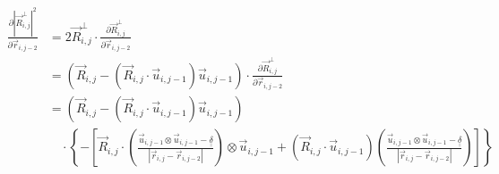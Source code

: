 \documentclass{article}
\renewcommand{\ij}{_{i,j}}
\newcommand{\ijj}{_{i,j-1}}
\newcommand{\ijjj}{_{i,j-2}}
\newcommand{\magn}[1]{\left\vert #1 \right\vert }
\renewcommand{\part}[2]{\frac{\partial #1 }{\partial #2}}
\newcommand{\partbig}[2]{\frac{\partial }{\partial #2}\left( #1 \right)}
\newcommand{\ten}[1]{\underline{\underline{#1}}}
\newcommand{\rij}{\vec{r} \ij}
\newcommand{\Rij}{\vec{R} \ij}
\newcommand{\rijjj}{\vec{r} \ijjj}
\newcommand{\uijj}{\vec{u} \ijj}
\begin{document}
\begin{align*}
  \part{
    \magn{\Rij^\perp}^2
  }{ \rijjj }
  &= 
  2 \Rij^\perp \cdot \part{\Rij^\perp}{\rijjj}
  \\
  &= 
  \left(
  \vec{R} \ij 
  - 
  \left(\vec{R} \ij \cdot \vec{u} \ijj \right) 
  \vec{u} \ijj 
  \right)
  \cdot 
  \part{\Rij^\perp}{\rijjj}
  \\
  &= 
  \left(
  \vec{R} \ij 
  - 
  \left(\vec{R} \ij \cdot \vec{u} \ijj \right) 
  \vec{u} \ijj 
  \right)
  \\
  & 
  \quad
  \cdot 
  \left\{
  -\left[
  \Rij \cdot 
  \left(
    \frac{\uijj \otimes \uijj - \ten{\delta}}{\magn{\rij - \rijjj}}
  \right)
  \otimes \uijj 
  + 
  \left(
  \vec{R}\ij \cdot \vec{u} \ijj
  \right)
  {
  \left(
  \frac{\uijj \otimes \uijj - \ten{\delta} }{\magn{\rij - \rijjj}}
  \right)
  }
  \right]
  \right\}
\end{align*}



\end{document}
